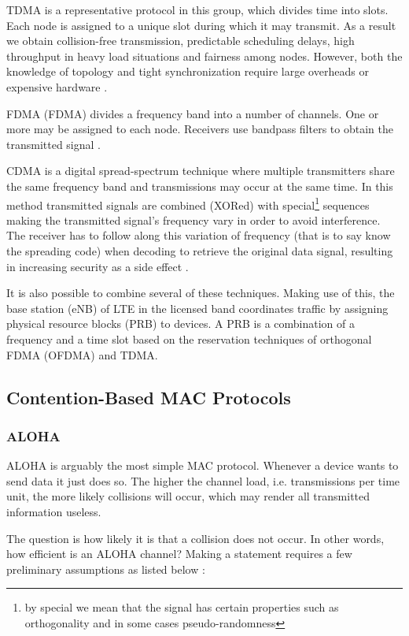TDMA is a representative protocol in this group, which divides time into slots. Each node is assigned to a unique slot during which it may transmit. As a result we obtain collision-free transmission, predictable scheduling delays, high throughput in heavy load situations and fairness among nodes. However, both the knowledge of topology and tight synchronization require large overheads or expensive hardware \cite{Bachir10}.

FDMA (FDMA) divides a frequency band into a number of channels. One or more may be assigned to each node. Receivers use bandpass filters to obtain the transmitted signal \cite{Garg07}.

CDMA is a digital spread-spectrum technique where multiple transmitters share the same frequency band and transmissions may occur at the same time. In this method transmitted signals are combined (XORed) with special\footnote{by special we mean that the signal has certain properties such as orthogonality and in some cases pseudo-randomness} sequences making the transmitted signal's frequency vary in order to avoid interference. The receiver has to follow along this variation of frequency (that is to say know the spreading code) when decoding to retrieve the original data signal, resulting in increasing security as a side effect \cite{Garg07}.

It is also possible to combine several of these techniques. Making use of this, the base station (eNB) of LTE in the licensed band coordinates traffic by assigning physical resource blocks (PRB) to devices. A PRB is a combination of a frequency and a time slot based on the reservation techniques of orthogonal FDMA (OFDMA) and TDMA. 

\subsection{Contention-Based MAC Protocols}
\subsubsection{ALOHA}
\label{sec:aloha}

ALOHA is arguably the most simple MAC protocol. Whenever a device wants to send data it just does so. The higher the channel load, i.e. transmissions per time unit, the more likely collisions will occur, which may render all transmitted information useless.

The question is how likely it is that a collision does not occur. In other words, how efficient is an ALOHA channel? Making a statement requires a few preliminary assumptions as listed below \cite{Tanenbaum02}:

